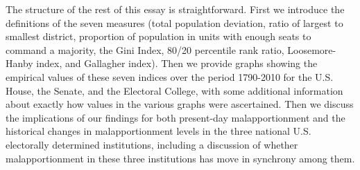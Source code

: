 The structure of the rest of this essay is straightforward. First we introduce the definitions of the seven measures (total population deviation, ratio of largest to smallest district, proportion of population in units with enough seats to command a majority, the Gini Index, 80/20 percentile rank ratio, Loosemore-Hanby index, and Gallagher index). Then we provide graphs showing the empirical values of these seven indices over the period 1790-2010 for the U.S. House, the Senate, and the Electoral College, with some additional information about exactly how values in the various graphs were ascertained. Then we discuss the implications of our findings for both present-day malapportionment and the historical changes in malapportionment levels in the three national U.S. electorally determined institutions, including a discussion of whether malapportionment in these three institutions has move in synchrony among them.

